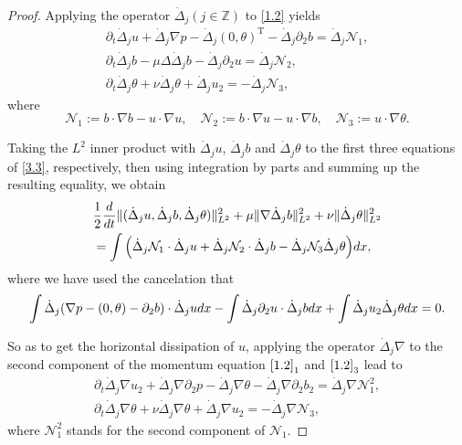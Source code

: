 \documentclass[10pt,a4paper]{amsart}
\numberwithin{equation}{section}
\begin{document}
\begin{proof}
Applying the operator $\dot{\Delta}_j (j\in\mathbb{Z})$ to \eqref{1.2} yields
\begin{equation}\label{3.3}
\begin{gathered}
 \partial_t\dot{\Delta}_ju+\dot{\Delta}_j\nabla p-\dot{\Delta}_j (0,\theta)^\mathrm{T}-\dot{\Delta}_j\partial_2b=\dot{\Delta}_j \mathcal{N}_1,\\
 \partial_t\dot{\Delta}_jb-\mu\Delta \dot{\Delta}_jb-\dot{\Delta}_j\partial_2u=\dot{\Delta}_j\mathcal{N}_2,\\
 \partial_t\dot{\Delta}_j\theta+\nu\dot{\Delta}_j\theta+\dot{\Delta}_ju_2=-\dot{\Delta}_j \mathcal{N}_3,
\end{gathered}
\end{equation}
where
\[
 \mathcal{N}_1:=b\cdot \nabla b-u\cdot \nabla u, \quad
 \mathcal{N}_2:=b\cdot \nabla u-u\cdot \nabla b, \quad
 \mathcal{N}_3:=u\cdot \nabla \theta.
\]

Taking the $L^2$ inner product with $\dot{\Delta}_ju$, $\dot{\Delta}_jb$ and
$\dot{\Delta}_j\theta$ to the first three equations of \eqref{3.3}, respectively,
then using integration by parts and summing up the resulting equality, we obtain
\begin{equation}\label{3.4}
\begin{aligned}
 &\frac{1}{2}\frac{\rm d}{{\rm d}t}\|(\dot{\Delta}_ju,\dot{\Delta}_jb,
 \dot{\Delta}_j\theta)\|_{L^2}^2+\mu\|\nabla\dot{\Delta}_jb\|_{L^2}^2
 +\nu\|\dot{\Delta}_j\theta\|_{L^2}^2 \\
 &=\int\Big(\dot{\Delta}_j \mathcal{N}_1\cdot \dot{\Delta}_ju+\dot{\Delta}_j
 \mathcal{N}_2\cdot \dot{\Delta}_jb-\dot{\Delta}_j \mathcal{N}_3
 \dot{\Delta}_j\theta\Big){\rm d}x,
\end{aligned}
\end{equation}
where we have used the cancelation that
\[
 \int\dot{\Delta}_j(\nabla p-(0,\theta)-\partial_2b)\cdot\dot{\Delta}_j u{\rm d}x-\int\dot{\Delta}_j\partial_2u\cdot\dot{\Delta}_jb{\rm d}x+\int\dot{\Delta}_ju_2\dot{\Delta}_j\theta{\rm d}x=0.
\]

So as to get the horizontal dissipation of $u$, applying the operator
$\dot{\Delta}_j\nabla$ to the second component of the momentum equation $\eqref{1.2}_1$
and $\eqref{1.2}_3$ lead to
\begin{equation}\label{3.5}
\begin{gathered}
 \partial_t\dot{\Delta}_j\nabla u_2+\dot{\Delta}_j\nabla\partial_2 p-\dot{\Delta}_j\nabla \theta-\dot{\Delta}_j\nabla\partial_2b_2=\dot{\Delta}_j\nabla \mathcal{N}_1^2,\\
 \partial_t\dot{\Delta}_j\nabla\theta+\nu\dot{\Delta}_j\nabla\theta+\dot{\Delta}_j\nabla u_2=-\dot{\Delta}_j\nabla\mathcal{N}_3,
\end{gathered}
\end{equation}
where $\mathcal{N}_1^2$ stands for the second component of $\mathcal{N}_1$.


\end{proof}
\end{document}
